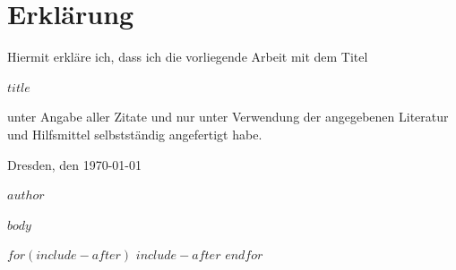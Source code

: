 \documentclass[DIV10, parskip*, headings=big, twopage, 10.5pt, cleardoublepage=plain,
   			bibliography=totoc, liststotoc, BCOR=12mm,
   			pointlessnumbers]{scrbook}
\begin{document}

\thispagestyle{empty}
\vspace*{\fill}

\section*{Erklärung}
Hiermit erkläre ich, dass ich die vorliegende Arbeit mit dem Titel

\vspace*{1em}
\begin{large}
\textsf{\textbf{$title$}}
\end{large}
\vspace*{1em}

unter Angabe aller Zitate und nur unter Verwendung der angegebenen Literatur
und Hilfsmittel selbstständig angefertigt habe.

Dresden, den \today\\
\vspace*{3em}

\emph{$author$}

\linespread{1.13}

\tableofcontents					%
\cleardoublepage

\linespread{1}



$body$

\thispagestyle{empty}

\begin{appendix}
\clearpage
\setcounter{page}{1}

$for(include-after)$
$include-after$
$endfor$

\renewcommand{\listfigurename}{Abbildungen}
\listoffigures

\renewcommand\lstlistlistingname{Programmcode}
\lstlistoflistings

\renewcommand\listtablename{Tabellen}
\listoftables

\printbibliography[title=Literatur]

\end{appendix}
\end{document}
